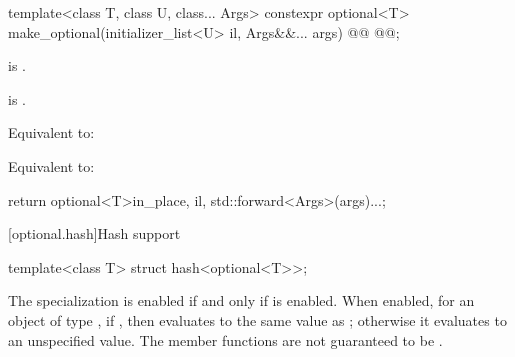 %
\begin{itemdecl}
template<class T, class U, class... Args>
  constexpr optional<T> make_optional(initializer_list<U> il, Args&&... args) @@
      @@;
\end{itemdecl}

\begin{itemdescr}
\begin{addedblock}
\pnum
\constraints
{} is .
\end{addedblock}

\begin{addedblock}
\pnum
\mandates
{} is .
\end{addedblock}

\begin{removedblock}
\pnum
\effects
Equivalent to: 
\end{removedblock}

\begin{addedblock}
\pnum
Equivalent to:
\begin{codeblock}
return optional<T>{in_place, il, std::forward<Args>(args)...};
\end{codeblock}
\end{addedblock}
\end{itemdescr}

[optional.hash]{Hash support}

\begin{itemdecl}
template<class T> struct hash<optional<T>>;
\end{itemdecl}

\begin{itemdescr}
\pnum
The specialization  is enabled if and only if  is enabled. When enabled, for an object  of type , if , then  evaluates to the same value as ; otherwise it evaluates to an unspecified value. The member functions are not guaranteed to be .
\end{itemdescr}
